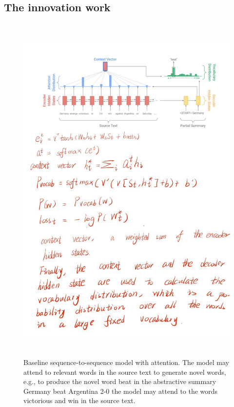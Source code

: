 \documentclass[UTF8]{ctexart}
\begin{document}
    \subsection{The innovation work}

    \begin{figure}[htbp]
        \centering
        \vspace{-0.35cm} 
        \includegraphics[width=14cm,height=18cm]{pictures/11.jpg}
        \caption{Baseline sequence-to-sequence model with attention. The model may attend to relevant words
        in the source text to generate novel words, e.g., to produce the novel word beat in the abstractive summary
        Germany beat Argentina 2-0 the model may attend to the words victorious and win in the source text.}
    \end{figure}
\end{document}
